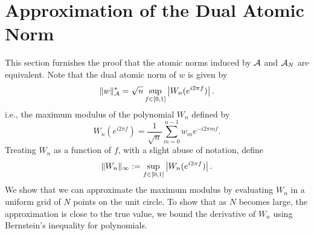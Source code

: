 \section{Approximation of the Dual Atomic Norm}
\label{proof:dual-norm-approximation}
This section furnishes the proof that the atomic norms induced by $\mathcal{A}$ and $\mathcal{A}_N$ are equivalent. Note that the dual atomic norm of $w$ is given by
\begin{equation}
  \label{eq:maximum-modulus}
  \lVert w\rVert_{\mathcal{A}}^* = \sqrt{n}\sup_{f \in [0,1]} \left| W_n(e^{i2\pi f}) \right|.
\end{equation}
i.e., the maximum modulus of the polynomial $W_n$ defined by
\begin{equation}
\label{eq:random-poly}
W_n(e^{i2\pi f}) =\frac{1}{\sqrt{n}} \sum_{m=0}^{n-1}{w_m e^{-i 2 \pi m f}}.
\end{equation}
Treating $W_n$ as a function of $f$,  with a slight abuse of  notation, define
\begin{equation*}
\lVert W_n\rVert_\infty := \sup_{f \in [0,1]} \left| W_n(e^{i2\pi f}) \right|.
\end{equation*}
We show that we can approximate the maximum modulus by evaluating $W_n$ in a
uniform grid of $N$ points on the unit circle. To show that as $N$ becomes large,
the approximation is close to the true value, we bound the derivative of $W_n$ 
using Bernstein's inequality for polynomials.

